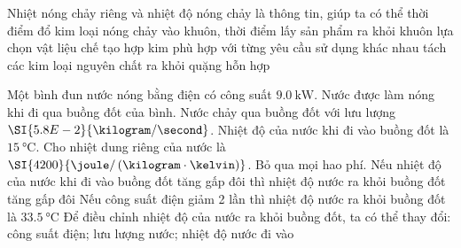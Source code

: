 \begin{ex}
	Nhiệt nóng chảy riêng và nhiệt độ nóng chảy là thông tin, giúp ta có thể
	{\True thời điểm đổ kim loại nóng chảy vào khuôn, thời điểm lấy sản phẩm ra khỏi khuôn}
	{\True lựa chọn vật liệu chế tạo hợp kim phù hợp với từng yêu cầu sử dụng khác nhau}
	{\True tách các kim loại nguyên chất ra khỏi quặng hỗn hợp}	
	
	\loigiai{}
\end{ex}
\begin{ex}
Một bình đun nước nóng bằng điện có công suất $\SI{9.0}{\kilo\watt}$. Nước được làm nóng khi đi qua buồng đốt của bình. Nước chảy qua buồng đốt với lưu lượng $\SI{5.8E-2}{\kilogram/\second}$. Nhiệt độ của nước khi đi vào buồng đốt là $\SI{15}{\celsius}$. Cho nhiệt dung riêng của nước là $\SI{4200}{\joule/\left(\kilogram\cdot\kelvin\right)}$. Bỏ qua mọi hao phí.
	{Nếu nhiệt độ của nước khi đi vào buồng đốt tăng gấp đôi thì nhiệt độ nước ra khỏi buồng đốt tăng gấp đôi}
	{\True Nếu công suất điện giảm 2 lần thì nhiệt độ nước ra khỏi buồng đốt là $\SI{33.5}{\celsius}$}
	{\True Để điều chỉnh nhiệt độ của nước ra khỏi buồng đốt, ta có thể thay đổi: công suất điện; lưu lượng nước; nhiệt độ nước đi vào}	

\end{ex}
